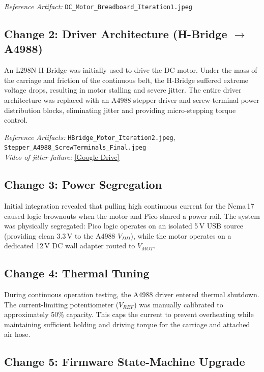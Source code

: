 \documentclass[12pt, letterpaper]{article}
\begin{document}
\textit{Reference Artifact:} \texttt{DC\_Motor\_Breadboard\_Iteration1.jpeg}

\subsection{Change 2: Driver Architecture (H-Bridge $\rightarrow$ A4988)}

An L298N H-Bridge was initially used to drive the DC motor. Under the mass of the carriage and friction of the continuous belt, the H-Bridge suffered extreme voltage drops, resulting in motor stalling and severe jitter. The entire driver architecture was replaced with an A4988 stepper driver and screw-terminal power distribution blocks, eliminating jitter and providing micro-stepping torque control.

\textit{Reference Artifacts:} \texttt{HBridge\_Motor\_Iteration2.jpeg}, \texttt{Stepper\_A4988\_ScrewTerminals\_Final.jpeg}\\
\textit{Video of jitter failure:} \href{https://drive.google.com/drive/folders/1wNK_jYUvHXoMne_cIdYbAIURdvYpuG-J}{[Google Drive]}

\subsection{Change 3: Power Segregation}

Initial integration revealed that pulling high continuous current for the Nema\,17 caused logic brownouts when the motor and Pico shared a power rail. The system was physically segregated: Pico logic operates on an isolated 5\,V USB source (providing clean 3.3\,V to the A4988 $V_{DD}$), while the motor operates on a dedicated 12\,V DC wall adapter routed to $V_{MOT}$.

\subsection{Change 4: Thermal Tuning}

During continuous operation testing, the A4988 driver entered thermal shutdown. The current-limiting potentiometer ($V_{REF}$) was manually calibrated to approximately 50\% capacity. This caps the current to prevent overheating while maintaining sufficient holding and driving torque for the carriage and attached air hose.

\subsection{Change 5: Firmware State-Machine Upgrade}
\end{document}
